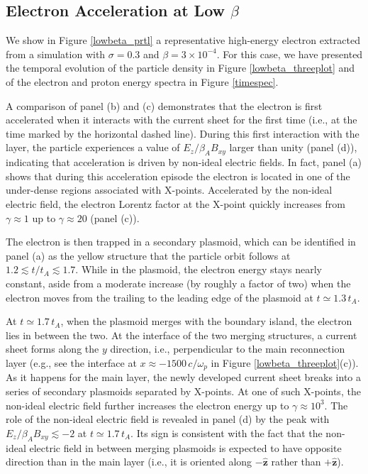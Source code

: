 \subsection{Electron Acceleration at Low $\beta$}
We show in Figure \ref{lowbeta_prtl} a representative high-energy electron extracted from a simulation with $\sigma=0.3$ and $\beta=3\times 10^{-4}$. For this case, we have presented the temporal evolution of the particle density in Figure \ref{lowbeta_threeplot} and of the electron and proton energy spectra in Figure \ref{timespec}.

A comparison of panel (b) and (c) demonstrates that the electron is first accelerated when it interacts with the current sheet for the first time (i.e., at the time marked by the horizontal dashed line). During this first interaction with the layer, the particle experiences a value of $E_{z}/\beta_{A}B_{xy}$ larger than unity (panel (d)), indicating that acceleration is driven by non-ideal electric fields. In fact, panel (a) shows that during this acceleration episode the electron is located in one of the under-dense regions associated with X-points. Accelerated by the non-ideal electric field, the electron Lorentz factor at the X-point quickly increases from $\gamma\approx 1$ up to $\gamma \approx 20$ (panel (c)).

The electron is then trapped in a secondary plasmoid, which can be identified in panel (a) as the yellow structure that the particle orbit follows at $1.2\lesssim t/ t_A\lesssim 1.7$. While in the plasmoid, the electron energy stays nearly constant, aside from a moderate increase (by roughly a factor of two) when the electron moves from the trailing to the leading edge of the plasmoid at $t\simeq 1.3\, t_A$. 

At $t\simeq 1.7\, t_A$, when the plasmoid merges with the boundary island, the electron lies in between the two. At the interface of the two  merging structures, a current sheet forms along the $y$ direction, i.e., perpendicular to the main reconnection layer (e.g., see the interface at $x\approx -1500 \, c/\omega_{p}$ in Figure \ref{lowbeta_threeplot}(c)). As it happens for the main layer, the newly developed current sheet breaks into a series of secondary plasmoids separated by X-points. At one of such X-points, the non-ideal electric field further increases the electron energy up to  $\gamma \approx 10^3$. The role of the non-ideal electric field is revealed in panel (d) by the peak with $E_{z}/\beta_{A}B_{xy}\lesssim -2$ at $t\simeq 1.7\, t_A$. Its sign is consistent with the fact that the non-ideal electric field in between merging plasmoids is expected to have opposite direction than in the main layer (i.e., it is oriented along $-\bm{\hat{z}}$ rather than $+\bm{\hat{z}}$). 

